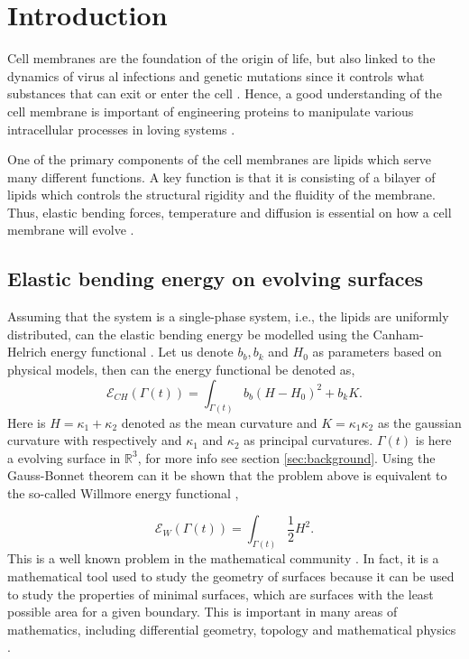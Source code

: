 \section{Introduction}\label{sec:introduction}

Cell membranes are the foundation of the origin of life, but also linked to the dynamics of virus al infections and genetic mutations since it controls what substances that can exit or enter the cell \cite{ hurley2010membrane}. Hence, a good
understanding of the cell membrane is important of engineering proteins to manipulate various intracellular processes in loving systems \cite{rojas1998genetic}.

One of the primary components of the cell membranes are lipids which serve many different functions. A key function is that it is consisting of a bilayer of lipids which controls the structural rigidity and the fluidity of the membrane. Thus, elastic
bending forces, temperature and diffusion is essential on how a cell membrane will evolve \cite{neidleman87}.


\subsection{Elastic bending energy on evolving surfaces}%
\label{sub:willmore_flow}

Assuming that the system is a single-phase system, i.e., the lipids are uniformly distributed, can the elastic bending energy be modelled using the Canham-Helrich energy functional \cite{helfrich1973elastic, wang08, udo97}. Let us denote $b_{b},
b_{k}$ and $H_{0}$ as parameters based on physical models, then can the energy functional be denoted as,
\begin{equation}
\label{eq:CH}
\mathcal{E} _{CH}\left( \Gamma\left( t \right)   \right) =   \int_{\Gamma\left( t \right)  }^{}  b_{b} \left( H- H_{0} \right) ^{2} + b_{k} K
.\end{equation}
Here is $H =  \kappa_1 + \kappa_2 $ denoted as the mean curvature and $K = \kappa_1 \kappa_2$ as the gaussian curvature with respectively and $\kappa_1$ and $\kappa_2$ as principal curvatures. $\Gamma \left( t
\right) $ is here a evolving surface in $\mathbb{R} ^3$, for more info see section \ref{sec:background}.  Using the Gauss-Bonnet theorem can it be shown that the problem above is equivalent to the so-called Willmore energy
functional \cite{montiel2009curves, willmore1996riemannian},

\begin{equation}
\label{eq:WE}
\mathcal{E} _{W} \left( \Gamma\left( t \right)   \right) = \int_{\Gamma\left( t \right)  }^{} \frac{1}{2} H ^2
.\end{equation}
This is a well known problem in the mathematical community \cite{ topping2000towards, marques2014willmore,link2013gradient,kuwert2012willmore}. In fact, it is a mathematical tool used to study the geometry of surfaces because it can be used to study the properties of minimal surfaces, which are surfaces with the least possible area for a given boundary. This is important in many areas of mathematics, including differential geometry, topology and mathematical physics \cite{koerber2021area,jakob2022singularities, rupp21}.


